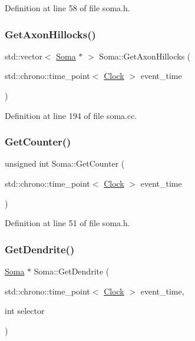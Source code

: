 Definition at line 58 of file soma.\+h.

\mbox{\label{class_soma_af76f86d082c3f60442148ec843b586e7}} 
\subsubsection{\texorpdfstring{Get\+Axon\+Hillocks()}{GetAxonHillocks()}}
{\footnotesize\ttfamily std\+::vector$<$ \mbox{\hyperlink{class_soma}{Soma}} $\ast$ $>$ Soma\+::\+Get\+Axon\+Hillocks (\begin{DoxyParamCaption}\item[{std\+::chrono\+::time\+\_\+point$<$ \mbox{\hyperlink{universe_8h_a0ef8d951d1ca5ab3cfaf7ab4c7a6fd80}{Clock}} $>$}]{event\+\_\+time }\end{DoxyParamCaption})}



Definition at line 194 of file soma.\+cc.

\mbox{\label{class_soma_a8bac091792e1ac47655bb549510e8960}} 
\subsubsection{\texorpdfstring{Get\+Counter()}{GetCounter()}}
{\footnotesize\ttfamily unsigned int Soma\+::\+Get\+Counter (\begin{DoxyParamCaption}\item[{std\+::chrono\+::time\+\_\+point$<$ \mbox{\hyperlink{universe_8h_a0ef8d951d1ca5ab3cfaf7ab4c7a6fd80}{Clock}} $>$}]{event\+\_\+time }\end{DoxyParamCaption})\hspace{0.3cm}{\ttfamily [inline]}}



Definition at line 51 of file soma.\+h.

\mbox{\label{class_soma_ab86537170d550cda0e7da080f7640f84}} 
\subsubsection{\texorpdfstring{Get\+Dendrite()}{GetDendrite()}}
{\footnotesize\ttfamily \mbox{\hyperlink{class_soma}{Soma}} $\ast$ Soma\+::\+Get\+Dendrite (\begin{DoxyParamCaption}\item[{std\+::chrono\+::time\+\_\+point$<$ \mbox{\hyperlink{universe_8h_a0ef8d951d1ca5ab3cfaf7ab4c7a6fd80}{Clock}} $>$}]{event\+\_\+time,  }\item[{int}]{selector }\end{DoxyParamCaption})}



